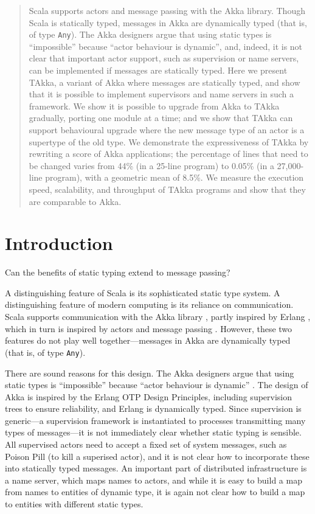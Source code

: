 \begin{abstract} 

  Scala supports actors and message passing with the Akka
  library. Though Scala is statically typed, messages in Akka are
  dynamically typed (that is, of type {\tt Any}).  The Akka designers
  argue that using static types is ``impossible'' because ``actor
  behaviour is dynamic'', and, indeed, it is not clear that important
  actor support, such as supervision or name servers, can be
  implemented if messages are statically typed. Here we present TAkka,
  a variant of Akka where messages are statically typed, and show that
  it is possible to implement supervisors and name servers in such a
  framework. We show it is possible to upgrade from Akka to TAkka
  gradually, porting one module at a time; and we show that TAkka can
  support behavioural upgrade where the new message type of an actor is
  a supertype of the old type. We demonstrate the expressiveness of
  TAkka by rewriting a score of Akka applications; the percentage of
  lines that need to be changed varies from 44\% (in a 25-line
  program) to 0.05\% (in a 27,000-line program), with a geometric mean
  of 8.5\%. We measure the execution speed, scalability, and
  throughput of TAkka programs and show that they are comparable to Akka.

\end{abstract}

\section{Introduction}

Can the benefits of static typing extend to message passing?

A distinguishing feature of Scala is its sophisticated static type
system.  A distinguishing feature of modern computing is its reliance
on communication.  Scala supports communication with the Akka library
\citep{akka_doc}, partly inspired by Erlang \citep{ArmstrongErlang}, which in
turn is inspired by actors and message passing \citep{Hewitt:1973}.
However, these two features do not play well together---messages
in Akka are dynamically typed (that is, of type {\tt Any}).

There are sound reasons for this design.  The Akka designers argue
that using static types is ``impossible'' because ``actor behaviour is
dynamic'' \citep{Kuhn11, Kuhn12}.  The design of Akka is
inspired by the Erlang OTP Design Principles, including supervision
trees to ensure reliability, and Erlang is dynamically typed.  Since
supervision is generic---a supervision framework is instantiated to
processes transmitting many types of messages---it is not immediately
clear whether static typing is sensible.  All supervised actors need
to accept a fixed set of system messages, such as Poison Pill (to kill a
superised actor), and it is not clear how to incorporate these into
statically typed messages.  An important part of distributed
infrastructure is a name server, which maps names to actors, and
while it is easy to build a map from names to entities of
dynamic type, it is again not clear how to build a map to entities
with different static types.

